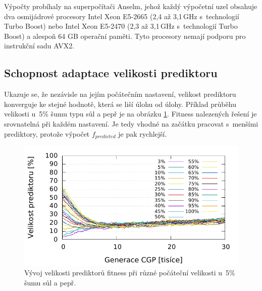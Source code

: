 \documentclass[fleqn,11pt]{ExcelAtFIT} %
\begin{document}
Výpočty probíhaly na superpočítači Anselm, jehož každý výpočetní uzel obsahuje dva osmijádrové procesory Intel Xeon E5-2665 (2,4 až 3,1\,GHz s~technologií Turbo Boost) nebo Intel Xeon E5-2470 (2,3 až 3,1\,GHz s~technologií Turbo Boost) a alespoň 64 GB operační paměti. Tyto procesory nemají podporu pro instrukční sadu AVX2.

\subsection{Schopnost adaptace velikosti prediktoru}

Ukazuje se, že nezávisle na jejím počátečním nastavení, velikost prediktoru konverguje ke stejné hodnotě, která se liší úlohu od úlohy. Příklad průběhu velikosti u~5\% šumu typu sůl a pepř je na obrázku \ref{fig:InitialSize}. Fitness nalezených řešení je srovnatelná při každém nastavení. Je tedy vhodné na začátku pracovat s~menšími prediktory, protože výpočet $f_\mathit{predicted}$ je pak rychlejší.


\begin{figure}[htb]
    \centering
    \includegraphics[width=\linewidth]{images/initial-size-5-30kg.pdf}
    \caption{Vývoj velikosti prediktorů fitness při různé počáteční velikosti u~5\% šumu sůl a pepř.}
    \label{fig:InitialSize}
\end{figure}
\end{document}
